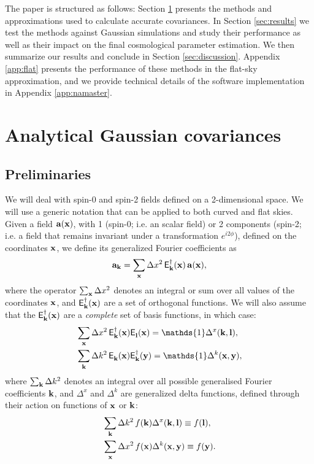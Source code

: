 \documentclass[a4paper,11pt]{article}
\newcommand{\summ}[1]{\sum_{\bf #1}\Delta #1^2}
\newcommand{\Ylm}[3]{{\sf E}^{#1}_{\bf #2}({\bf #3})}
\begin{document}
    The paper is structured as follows: Section \ref{sec:theory} presents the methods and approximations used to calculate accurate covariances. In Section \ref{sec:results} we test the methods against Gaussian simulations and study their performance as well as their impact on the final cosmological parameter estimation. We then summarize our results and conclude in Section \ref{sec:discussion}. Appendix \ref{app:flat} presents the performance of these methods in the flat-sky approximation, and we provide technical details of the software implementation in Appendix \ref{app:namaster}.

  \section{Analytical Gaussian covariances}\label{sec:theory}
    \subsection{Preliminaries}\label{ssec:theory.prelim}
      We will deal with spin-0 and spin-2 fields defined on a 2-dimensional
      space. We will use a generic notation that can be applied to both
      curved and flat skies. Given a field ${\bf a}({\bf x})$, with 1
      (spin-0; i.e. an scalar field) or 2 components (spin-2; i.e. a field
      that remains invariant under a transformation $e^{i2\phi}$), defined on the coordinates ${\bf x}$, we define its generalized Fourier coefficients as
      \begin{equation}
        {\bf a}_{\bf k}=\summ{x}\,\Ylm{\dag}{k}{x}\,{\bf a}({\bf x}),
      \end{equation}
      where the operator $\summ{x}$ denotes an integral or sum over all values of the coordinates ${\bf x}$, and $\Ylm{\dag}{k}{x}$ are a set of orthogonal functions. We will also assume that the $\Ylm{\dag}{k}{x}$ are a \emph{complete} set of basis functions, in which case:
      \begin{align}
        &\summ{x}\,\Ylm{\dag}{k}{x}\Ylm{}{l}{x}=\mathds{1}\Delta^x({\bf k},{\bf l}),\\
        &\summ{k}\,\Ylm{}{k}{x}\Ylm{\dag}{k}{y}=\mathds{1}\Delta^k({\bf x},{\bf y}),
      \end{align}
      where $\summ{k}$ denotes an integral over all possible generalised Fourier coefficients ${\bf k}$, and $\Delta^x$ and $\Delta^k$ are generalized delta functions, defined through their action on functions of ${\bf x}$ or ${\bf k}$:
      \begin{align}
        &\summ{k}\,f({\bf k})\Delta^x({\bf k},{\bf l})\equiv f({\bf l}),\\
        &\summ{x}\,f({\bf x})\Delta^k({\bf x},{\bf y})\equiv f({\bf y}).
      \end{align}
\end{document}
